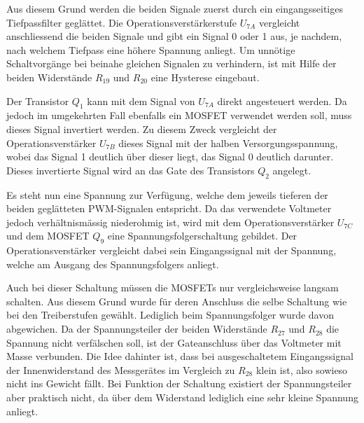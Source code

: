 Aus diesem Grund werden die beiden Signale zuerst durch ein eingangsseitiges Tiefpassfilter geglättet. Die Operationsverstärkerstufe $U_{7A}$ vergleicht anschliessend die beiden Signale und gibt ein Signal 0 oder 1 aus, je nachdem, nach welchem Tiefpass eine höhere Spannung anliegt. Um unnötige Schaltvorgänge bei beinahe gleichen Signalen zu verhindern, ist mit Hilfe der beiden Widerstände $R_{19}$ und $R_{20}$ eine Hysterese eingebaut.

Der Transistor $Q_1$ kann mit dem Signal von $U_{7A}$ direkt angesteuert werden. Da jedoch im umgekehrten Fall ebenfalls ein MOSFET verwendet werden soll, muss dieses Signal invertiert werden. Zu diesem Zweck vergleicht der Operationsverstärker $U_{7B}$ dieses Signal mit der halben Versorgungsspannung, wobei das Signal 1 deutlich über dieser liegt, das Signal 0 deutlich darunter. Dieses invertierte Signal wird an das Gate des Transistors $Q_2$ angelegt.

Es steht nun eine Spannung zur Verfügung, welche dem jeweils tieferen der beiden geglätteten PWM-Signalen entspricht. Da das verwendete Voltmeter jedoch verhältnismässig niederohmig ist, wird mit dem Operationsverstärker $U_{7C}$ und dem MOSFET $Q_9$ eine Spannungsfolgerschaltung gebildet. Der Operationsverstärker vergleicht dabei sein Eingangssignal mit der Spannung, welche am Ausgang des Spannungsfolgers anliegt.

Auch bei dieser Schaltung müssen die MOSFETs nur vergleichsweise langsam schalten. Aus diesem Grund wurde für deren Anschluss die selbe Schaltung wie bei den Treiberstufen gewählt. Lediglich beim Spannungsfolger wurde davon abgewichen. Da der Spannungsteiler der beiden Widerstände $R_{27}$ und $R_{28}$ die Spannung nicht verfälschen soll, ist der Gateanschluss über das Voltmeter mit Masse verbunden. Die Idee dahinter ist, dass bei ausgeschaltetem Eingangssignal der Innenwiderstand des Messgerätes im Vergleich zu $R_{28}$ klein ist, also sowieso nicht ins Gewicht fällt. Bei Funktion der Schaltung existiert der Spannungsteiler aber praktisch nicht, da über dem Widerstand lediglich eine sehr kleine Spannung anliegt.